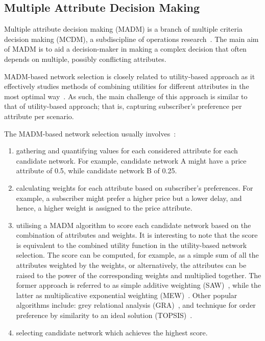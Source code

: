 \subsection{Multiple Attribute Decision Making} %
\label{sub:multiple_attribute_decision_making_intelligent}
Multiple attribute decision making (MADM) is a branch of multiple criteria decision making (MCDM), a subdiscipline of operations research~\cite{Triantaphyllou2000}. The main aim of MADM is to aid a decision-maker in making a complex decision that often depends on multiple, possibly conflicting attributes.

MADM-based network selection is closely related to utility-based approach as it effectively studies methods of combining utilities for different attributes in the most optimal way~\cite{BariLeung2007c}. As such, the main challenge of this approach is similar to that of utility-based approach; that is, capturing subscriber's preference per attribute per scenario.

The MADM-based network selection usually involves~\cite{LushengBinet2009}:
\begin{enumerate}
\item gathering and quantifying values for each considered attribute for each candidate network. For example, candidate network A might have a price attribute of 0.5, while candidate network B of 0.25.
\item calculating weights for each attribute based on subscriber's preferences. For example, a subscriber might prefer a higher price but a lower delay, and hence, a higher weight is assigned to the price attribute.
\item utilising a MADM algorithm to score each candidate network based on the combination of attributes and weights. It is interesting to note that the score is equivalent to the combined utility function in the utility-based network selection. The score can be computed, for example, as a simple sum of all the attributes weighted by the weights, or alternatively, the attributes can be raised to the power of the corresponding weights and multiplied together. The former approach is referred to as simple additive weighting (SAW)~\cite{BariLeung2007a}, while the latter as multiplicative exponential weighting (MEW)~\cite{Nguyen2008}. Other popular algorithms include: grey relational analysis (GRA)~\cite{Song2005}, and technique for order preference by similarity to an ideal solution (TOPSIS)~\cite{BariLeung2007b}.
\item selecting candidate network which achieves the highest score.
\end{enumerate}

